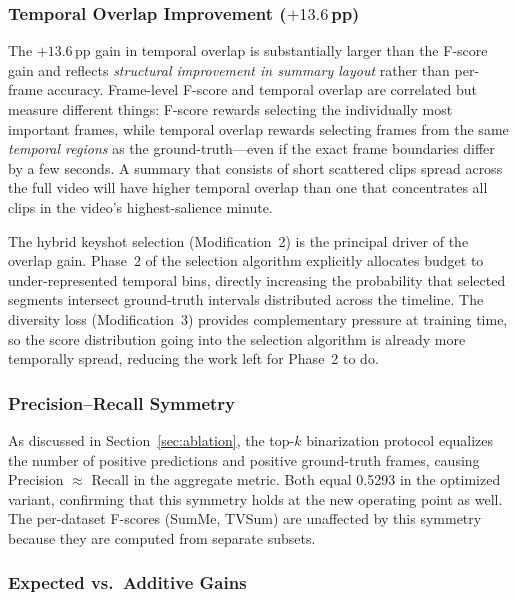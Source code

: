 \documentclass[10pt,conference]{IEEEtran}
\begin{document}
\subsubsection{Temporal Overlap Improvement ($+13.6$\,pp)}

The $+13.6$\,pp gain in temporal overlap is substantially larger than the
F-score gain and reflects \emph{structural improvement in summary layout}
rather than per-frame accuracy. Frame-level F-score and temporal overlap are
correlated but measure different things: F-score rewards selecting the
individually most important frames, while temporal overlap rewards selecting
frames from the same \emph{temporal regions} as the ground-truth---even if
the exact frame boundaries differ by a few seconds. A summary that consists
of short scattered clips spread across the full video will have higher
temporal overlap than one that concentrates all clips in the video's
highest-salience minute.

The hybrid keyshot selection (Modification~2) is the principal driver of the
overlap gain. Phase~2 of the selection algorithm explicitly allocates budget
to under-represented temporal bins, directly increasing the probability that
selected segments intersect ground-truth intervals distributed across the
timeline. The diversity loss (Modification~3) provides complementary pressure
at training time, so the score distribution going into the selection algorithm
is already more temporally spread, reducing the work left for Phase~2 to do.

\subsubsection{Precision--Recall Symmetry}

As discussed in Section~\ref{sec:ablation}, the top-$k$ binarization protocol
equalizes the number of positive predictions and positive ground-truth frames,
causing Precision $\approx$ Recall in the aggregate metric. Both equal 0.5293
in the optimized variant, confirming that this symmetry holds at the new
operating point as well. The per-dataset F-scores (SumMe, TVSum) are
unaffected by this symmetry because they are computed from separate subsets.

\subsubsection{Expected vs.\ Additive Gains}
\end{document}
